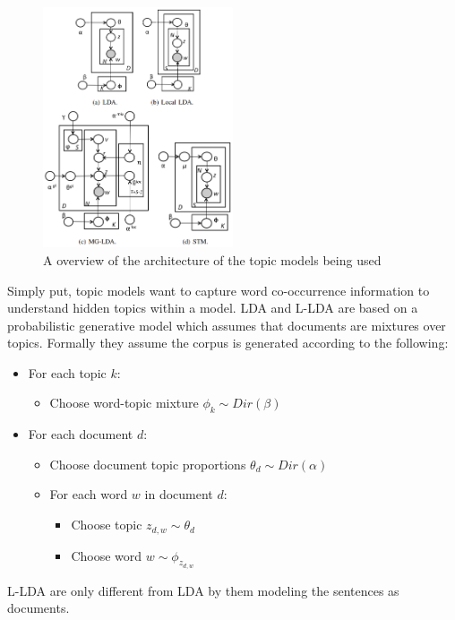 \documentclass[conference]{IEEEtran}
\begin{document}
\begin{figure}[htbp]
\centerline{\includegraphics[keepaspectratio, width=0.5\textwidth]{pics/12.png}}
\caption{A overview of the architecture of the topic models being used}
\label{fig}
\end{figure}

Simply put, topic models want to capture word co-occurrence information to understand hidden topics within a model. LDA and L-LDA are based on a probabilistic generative model which assumes that documents are mixtures over topics. Formally they assume the corpus is generated according to the following:
\begin{itemize}
\item For each topic $k$:
  \begin{itemize}
  \item Choose word-topic mixture $\phi_k \sim Dir(\beta)$
  \end{itemize}

\item For each document $d$:
  \begin{itemize}
  \item Choose document topic proportions $\theta_d \sim Dir(\alpha)$
  
  \item For each word $w$ in document $d$:
    \begin{itemize}
    \item Choose topic $z_{d,w} \sim \theta_d$
    \item Choose word $w \sim \phi_{z_{d,w}}$
    \end{itemize}
  \end{itemize}
\end{itemize}
L-LDA are only different from LDA by them modeling the sentences as documents.
\end{document}
